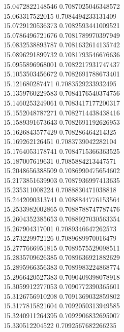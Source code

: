 {15.0472822148546 0.7087025046348572 \\
15.063317522015 0.7084494233131409 \\
15.0729120536373 0.7082593441009521 \\
15.0786496721676 0.7081789970397949 \\
15.0832538893787 0.7081632614135742 \\
15.0896291899732 0.7081793546676636 \\
15.0955896968001 0.7082217931747437 \\
15.1053503456672 0.7082691788673401 \\
15.121680287471 0.7083529233932495 \\
15.1359760229583 0.7084176540374756 \\
15.1460253249061 0.7083417177200317 \\
15.1552048787271 0.7082714438438416 \\
15.1589391673643 0.7082691192626953 \\
15.1626843577429 0.708286464214325 \\
15.169262126451 0.7083739042282104 \\
15.1764053178741 0.7084715366363525 \\
15.187007619631 0.7085884213447571 \\
15.2048656388509 0.7086990475654602 \\
15.2173851639903 0.7087936997413635 \\
15.235311008224 0.7088830471038818 \\
15.2442090313741 0.7088844776153564 \\
15.2533982002865 0.7088788747787476 \\
15.2604352385653 0.7088927030563354 \\
15.267904317001 0.7089346647262573 \\
15.273229972126 0.7089689970016479 \\
15.2777666951815 0.7089575529098511 \\
15.2835709626385 0.7089636921882629 \\
15.2895966356383 0.7089983224868774 \\
15.2966420527383 0.7090409398078918 \\
15.3059912277053 0.7090772390365601 \\
15.3126756910208 0.7091369032859802 \\
15.3177815821604 0.7092050313949585 \\
15.3240911264395 0.7092906832695007 \\
15.330512204522 0.7092567682266235 \\
}

